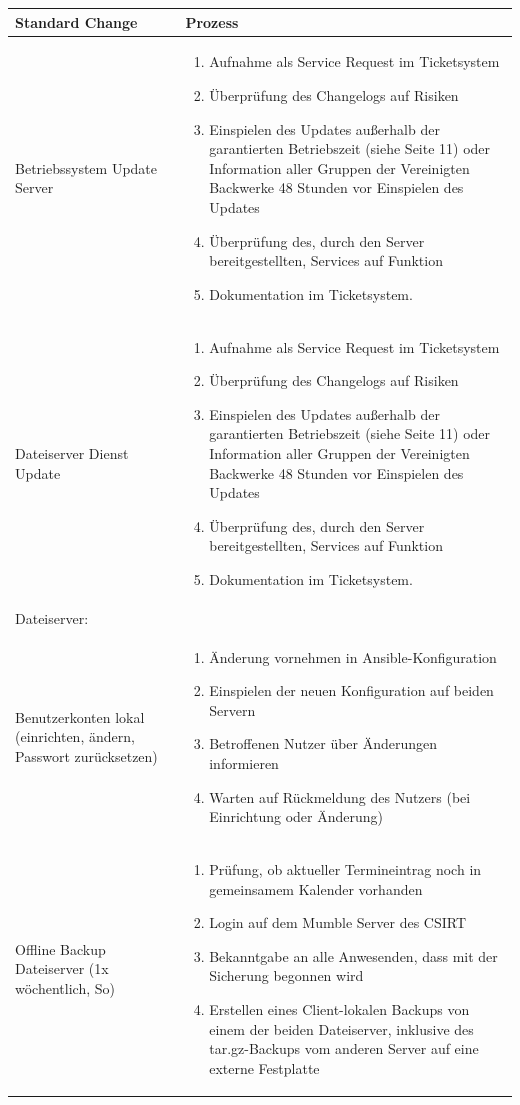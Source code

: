 \documentclass[]{article}
\begin{document}
\begin{longtable}{|p{3cm}|p{10cm}|}
\toprule
Standard Change & Prozess\tabularnewline
\midrule
Betriebssystem Update Server & \begin{enumerate}
\item
  Aufnahme als Service Request im Ticketsystem
\item
  Überprüfung des Changelogs auf Risiken
\item
  Einspielen des Updates außerhalb der garantierten Betriebszeit (siehe Seite
  11) oder Information aller Gruppen der Vereinigten Backwerke 48 Stunden vor
  Einspielen des Updates
\item
  Überprüfung des, durch den Server bereitgestellten, Services auf
  Funktion
\item
  Dokumentation im Ticketsystem.
\end{enumerate}\tabularnewline
\midrule

Dateiserver Dienst Update &
\begin{enumerate}
\item
  Aufnahme als Service Request im Ticketsystem
\item
  Überprüfung des Changelogs auf Risiken

\item
  Einspielen des Updates außerhalb der garantierten Betriebszeit (siehe Seite 11) oder Information aller Gruppen der Vereinigten Backwerke 48 Stunden vor Einspielen des Updates

\item
  Überprüfung des, durch den Server bereitgestellten, Services auf
  Funktion
\item
  Dokumentation im Ticketsystem.
\end{enumerate}\tabularnewline
Dateiserver:\\ Benutzerkonten lokal (einrichten, ändern, Passwort
zurücksetzen) & \begin{enumerate}
\item
  Änderung vornehmen in Ansible-Konfiguration
\item
  Einspielen der neuen Konfiguration auf beiden Servern
\item
  Betroffenen Nutzer über Änderungen informieren
\item
  Warten auf Rückmeldung des Nutzers (bei Einrichtung oder Änderung)
\end{enumerate}\tabularnewline
Offline Backup Dateiserver (1x wöchentlich, So) &
\begin{enumerate}
\item
  Prüfung, ob aktueller Termineintrag noch in gemeinsamem Kalender
  vorhanden
\item
  Login auf dem Mumble Server des CSIRT
\item
  Bekanntgabe an alle Anwesenden, dass mit der Sicherung begonnen wird
\item
  Erstellen eines Client-lokalen Backups von einem der beiden
  Dateiserver, inklusive des tar.gz-Backups vom anderen Server auf eine
  externe Festplatte


\end{enumerate}
\end{longtable}
\end{document}
